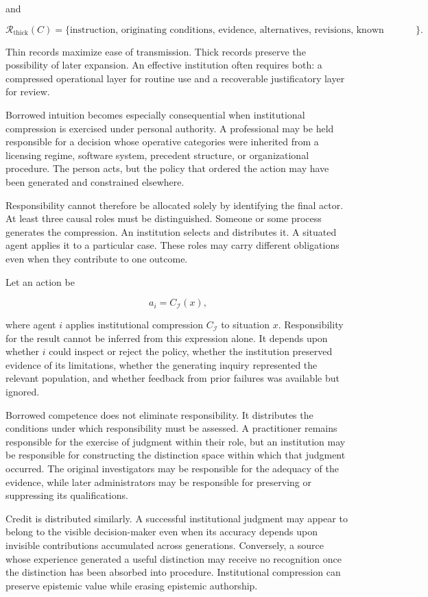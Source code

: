 \documentclass[11pt]{article}
\begin{document}
and

\[
\mathcal{R}_{\mathrm{thick}}(C)
=
\{\text{instruction, originating conditions, evidence,
alternatives, revisions, known failures}\}.
\]

Thin records maximize ease of transmission. Thick records preserve the possibility of later expansion. An effective institution often requires both: a compressed operational layer for routine use and a recoverable justificatory layer for review.

Borrowed intuition becomes especially consequential when institutional compression is exercised under personal authority. A professional may be held responsible for a decision whose operative categories were inherited from a licensing regime, software system, precedent structure, or organizational procedure. The person acts, but the policy that ordered the action may have been generated and constrained elsewhere.

Responsibility cannot therefore be allocated solely by identifying the final actor. At least three causal roles must be distinguished. Someone or some process generates the compression. An institution selects and distributes it. A situated agent applies it to a particular case. These roles may carry different obligations even when they contribute to one outcome.

Let an action be

\[
a_i
=
C_{\mathcal{I}}(x),
\]

where agent $i$ applies institutional compression $C_{\mathcal{I}}$ to situation $x$. Responsibility for the result cannot be inferred from this expression alone. It depends upon whether $i$ could inspect or reject the policy, whether the institution preserved evidence of its limitations, whether the generating inquiry represented the relevant population, and whether feedback from prior failures was available but ignored.

Borrowed competence does not eliminate responsibility. It distributes the conditions under which responsibility must be assessed. A practitioner remains responsible for the exercise of judgment within their role, but an institution may be responsible for constructing the distinction space within which that judgment occurred. The original investigators may be responsible for the adequacy of the evidence, while later administrators may be responsible for preserving or suppressing its qualifications.

Credit is distributed similarly. A successful institutional judgment may appear to belong to the visible decision-maker even when its accuracy depends upon invisible contributions accumulated across generations. Conversely, a source whose experience generated a useful distinction may receive no recognition once the distinction has been absorbed into procedure. Institutional compression can preserve epistemic value while erasing epistemic authorship.
\end{document}
